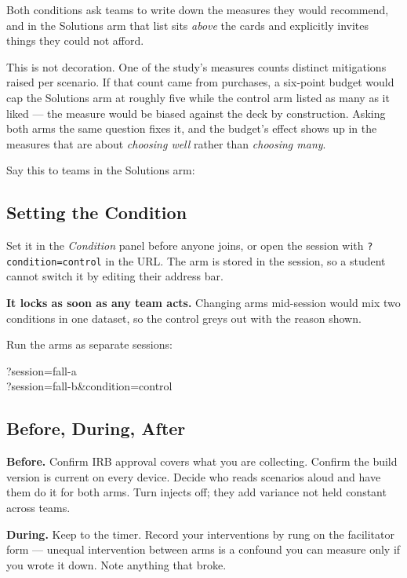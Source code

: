 Both conditions ask teams to write down the measures they would recommend, and in
the Solutions arm that list sits \emph{above} the cards and explicitly invites
things they could not afford.

This is not decoration. One of the study's measures counts distinct mitigations
raised per scenario. If that count came from purchases, a six-point budget would
cap the Solutions arm at roughly five while the control arm listed as many as it
liked --- the measure would be biased against the deck by construction. Asking
both arms the same question fixes it, and the budget's effect shows up in the
measures that are about \emph{choosing well} rather than \emph{choosing many}.

Say this to teams in the Solutions arm: 

\subsection{Setting the Condition}

Set it in the \emph{Condition} panel before anyone joins, or open the session
with \texttt{?condition=control} in the URL. The arm is stored in the session, so
a student cannot switch it by editing their address bar.

\textbf{It locks as soon as any team acts.} Changing arms mid-session would mix
two conditions in one dataset, so the control greys out with the reason shown.

Run the arms as separate sessions:

\begin{center}\small\ttfamily
?session=fall-a\\
?session=fall-b\&condition=control
\end{center}

\subsection{Before, During, After}

\textbf{Before.} Confirm IRB approval covers what you are collecting. Confirm the
build version is current on every device. Decide who reads scenarios aloud and
have them do it for both arms. Turn injects off; they add variance not held
constant across teams.

\textbf{During.} Keep to the timer. Record your interventions by rung on the
facilitator form --- unequal intervention between arms is a confound you can
measure only if you wrote it down. Note anything that broke.


